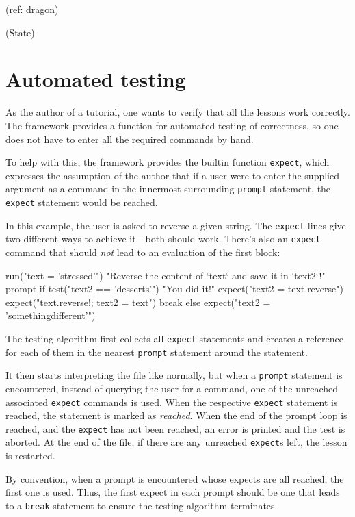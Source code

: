 \documentclass[paper=a4,twoside,abstract=on,cleardoublepage=empty,numbers=noenddot,toc=bib,11pt,appendixprefix=true]{scrreprt}
\begin{document}
(ref: dragon)

(State)

\section{Automated testing}

As the author of a tutorial, one wants to verify that all the lessons work correctly. The framework provides a function for automated testing of correctness, so one does not have to enter all the required commands by hand.

To help with this, the framework provides the builtin function \texttt{expect}, which expresses the assumption of the author that if a user were to enter the supplied argument as a command in the innermost surrounding \texttt{prompt} statement, the \texttt{expect} statement would be reached.

In this example, the user is asked to reverse a given string. The \texttt{expect} lines give two different ways to achieve it---both should work. There's also an \texttt{expect} command that should \emph{not} lead to an evaluation of the first block:

\begin{nutsh}
run("text = 'stressed'")
"Reverse the content of `text` and save it in `text2`!"
prompt {
    if test("text2 == 'desserts'") {
        "You did it!"
        expect("text2 = text.reverse")
        expect("text.reverse!; text2 = text")
        break
    } else {
        expect("text2 = 'somethingdifferent'")
    }
}
\end{nutsh}

The testing algorithm first collects all \texttt{expect} statements and creates a reference for each of them in the nearest \texttt{prompt} statement around the statement.

It then starts interpreting the file like normally, but when a \texttt{prompt} statement is encountered, instead of querying the user for a command, one of the unreached associated \texttt{expect} commands is used. When the respective \texttt{expect} statement is reached, the statement is marked as \emph{reached}. When the end of the prompt loop is reached, and the \texttt{expect} has not been reached, an error is printed and the test is aborted. At the end of the file, if there are any unreached \texttt{expect}s left, the lesson is restarted.

By convention, when a prompt is encountered whose expects are all reached, the first one is used. Thus, the first expect in each prompt should be one that leads to a \texttt{break} statement to ensure the testing algorithm terminates.
\end{document}
